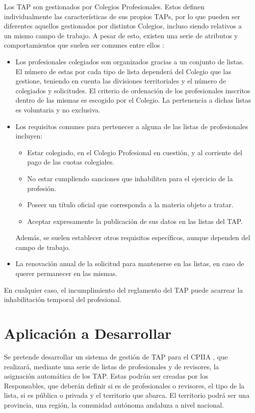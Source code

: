 Los TAP son gestionados por Colegios Profesionales. Estos definen individualmente las características de sus propios TAPs, por lo que pueden ser diferentes aquellos gestionados por distintos Colegios, incluso siendo relativos a un mismo campo de trabajo. A pesar de esto, existen una serie de atributos y comportamientos que suelen ser comunes entre ellos \cite{colegiosinformaticaccii}:
\begin{itemize}
\item Los profesionales colegiados son organizados gracias a un conjunto de listas. El número de estas por cada tipo de lista dependerá del Colegio que las gestione, teniendo en cuenta las divisiones territoriales y el número de colegiados y solicitudes. El criterio de ordenación de los profesionales inscritos dentro de las mismas es escogido por el Colegio. La pertenencia a dichas listas es voluntaria y no exclusiva.
\item Los requisitos comunes para pertenecer a alguna de las listas de profesionales incluyen:
	\begin{itemize}
	\item Estar colegiado, en el Colegio Profesional en cuestión, y al corriente del pago de las cuotas colegiales.
	\item No estar cumpliendo sanciones que inhabiliten para el ejercicio de la profesión.
	\item Poseer un título oficial que corresponda a la materia objeto a tratar.
	\item Aceptar expresamente la publicación de sus datos en las listas del TAP.
	\end{itemize}
Además, se suelen establecer otros requisitos específicos, aunque dependen del campo de trabajo.
\item La renovación anual de la solicitud para mantenerse en las listas, en caso de querer permanecer en las mismas. \\
\end{itemize}

En cualquier caso, el incumplimiento del reglamento del TAP puede acarrear la inhabilitación temporal del profesional.


\section{Aplicación a Desarrollar}
Se pretende desarrollar un sistema de gestión de TAP para el CPIIA \cite{reglamentotapcpiia}, que realizará, mediante una serie de listas de profesionales y de revisores, la asignación automática de los TAP. Estas podrán ser creadas por los Responsables, que deberán definir si es de profesionales o revisores, el tipo de la lista, si es pública o privada y el territorio que abarca. El territorio podrá ser una provincia, una región, la comunidad autónoma andaluza a nivel nacional. \\

